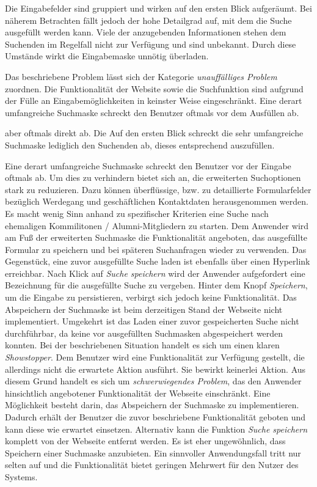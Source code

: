 {
	Die Eingabefelder sind gruppiert und wirken auf den ersten Blick aufgeräumt. Bei näherem Betrachten fällt jedoch der hohe Detailgrad auf, mit dem die Suche ausgefüllt werden kann. Viele der anzugebenden Informationen stehen dem Suchenden im Regelfall nicht zur Verfügung und sind unbekannt. Durch diese Umstände wirkt die Eingabemaske unnötig überladen.
}
{
	Das beschriebene Problem lässt sich der Kategorie \emph{unauffälliges Problem} zuordnen. Die Funktionalität der Website sowie die Suchfunktion sind aufgrund der Fülle an Eingabemöglichkeiten in keinster Weise eingeschränkt. Eine derart umfangreiche Suchmaske schreckt den Benutzer oftmals vor dem Ausfüllen ab.
	
	 aber oftmals direkt ab. Die  Auf den ersten Blick schreckt die sehr umfangreiche Suchmaske lediglich den Suchenden ab, dieses entsprechend auszufüllen.
}
{
	Eine derart umfangreiche Suchmaske schreckt den Benutzer vor der Eingabe oftmals ab. Um dies zu verhindern bietet sich an, die erweiterten Suchoptionen stark zu reduzieren. Dazu können überflüssige, bzw. zu detaillierte Formularfelder bezüglich Werdegang und geschäftlichen Kontaktdaten herausgenommen werden. Es macht wenig Sinn anhand zu spezifischer Kriterien eine Suche nach ehemaligen Kommilitonen / Alumni-Mitgliedern zu starten.
}
{
	Dem Anwender wird am Fuß der erweiterten Suchmaske die Funktionalität angeboten, das ausgefüllte Formular zu speichern und bei späteren Suchanfragen wieder zu verwenden. Das Gegenstück, eine zuvor ausgefüllte Suche laden ist ebenfalls über einen Hyperlink erreichbar. Nach Klick auf \emph{Suche speichern} wird der Anwender aufgefordert eine Bezeichnung für die ausgefüllte Suche zu vergeben. Hinter dem Knopf \emph{Speichern}, um die Eingabe zu persistieren, verbirgt sich jedoch keine Funktionalität. Das Abspeichern der Suchmaske ist beim derzeitigen Stand der Webseite nicht implementiert. Umgekehrt ist das Laden einer zuvor gespeicherten Suche nicht durchführbar, da keine vor ausgefüllten Suchmasken abgespeichert werden konnten.
}
{
	Bei der beschriebenen Situation handelt es sich um einen klaren \emph{Showstopper}. Dem Benutzer wird eine Funktionalität zur Verfügung gestellt, die allerdings nicht die erwartete Aktion ausführt. Sie bewirkt keinerlei Aktion. Aus diesem Grund handelt es sich um \emph{schwerwiegendes Problem}, das den Anwender hinsichtlich angebotener Funktionalität der Webseite einschränkt.
}
{
	Eine Möglichkeit besteht darin, das Abspeichern der Suchmaske zu implementieren. Dadurch erhält der Benutzer die zuvor beschriebene Funktionalität geboten und kann diese wie erwartet einsetzen. Alternativ kann die Funktion \emph{Suche speichern} komplett von der Webseite entfernt werden. Es ist eher ungewöhnlich, dass Speichern einer Suchmaske anzubieten. Ein sinnvoller Anwendungsfall tritt nur selten auf und die Funktionalität bietet geringen Mehrwert für den Nutzer des Systems.
}

